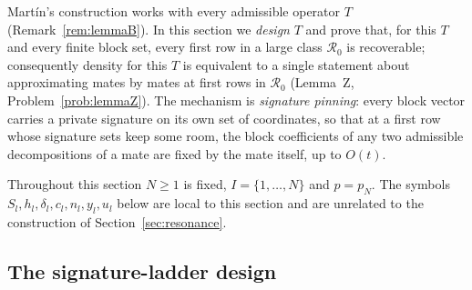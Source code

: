 \documentclass[10pt]{amsart}
\theoremstyle{definition}
\theoremstyle{remark}
\begin{document}
Mart\'in's construction works with every admissible operator $T$
(Remark~\ref{rem:lemmaB}).  In this section we \emph{design} $T$ and prove
that, for this $T$ and every finite block set, every first row in a large
class $\mathcal R_0$ is recoverable; consequently density for this $T$ is
equivalent to a single statement about approximating mates by mates at
first rows in $\mathcal R_0$ (Lemma~Z, Problem~\ref{prob:lemmaZ}).  The
mechanism is \emph{signature pinning}: every block vector carries a private
signature on its own set of coordinates, so that at a first row whose
signature sets keep some room, the block coefficients of any two admissible
decompositions of a mate are fixed by the mate itself, up to $O(t)$.

Throughout this section $N\ge1$ is fixed, $I=\{1,\dots,N\}$ and $p=p_N$.
The symbols $S_l,h_l,\delta_l,c_l,n_l,y_l,u_l$ below are local to this
section and are unrelated to the construction of
Section~\ref{sec:resonance}.

\subsection{The signature-ladder design}
\end{document}
